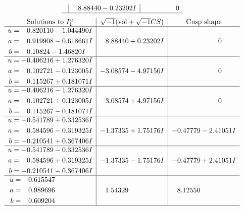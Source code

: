 \documentclass[1p]{elsarticle_modified}
\theoremstyle{definition}
\newcommand{\I}{\sqrt{-1}}
\begin{document}
$$\begin{array}{c|c|c}
 & \phantom{-}8.88440 - 0.23202 I & \phantom{-0.000000 } 0\\
 \hline 
 \end{array}$$\newpage$$\begin{array}{c|c|c}  
\text{Solutions to }I^u_{1}& \I (\text{vol} + \sqrt{-1}CS) & \text{Cusp shape}\\
 \hline 
\begin{aligned}
u &= \phantom{-}0.820110 - 1.044490 I \\
a &= \phantom{-}0.919908 - 0.618661 I \\
b &= \phantom{-}0.10824 - 1.46820 I\end{aligned}
 & \phantom{-}8.88440 + 0.23202 I & \phantom{-0.000000 } 0 \\ \hline\begin{aligned}
u &= -0.406216 + 1.276320 I \\
a &= \phantom{-}0.102721 - 0.123005 I \\
b &= \phantom{-}0.115267 + 0.181071 I\end{aligned}
 & -3.08574 - 4.97156 I & \phantom{-0.000000 } 0 \\ \hline\begin{aligned}
u &= -0.406216 - 1.276320 I \\
a &= \phantom{-}0.102721 + 0.123005 I \\
b &= \phantom{-}0.115267 - 0.181071 I\end{aligned}
 & -3.08574 + 4.97156 I & \phantom{-0.000000 } 0 \\ \hline\begin{aligned}
u &= -0.541789 + 0.332536 I \\
a &= \phantom{-}0.584596 - 0.319325 I \\
b &= -0.210541 + 0.367406 I\end{aligned}
 & -1.37335 + 1.75176 I & -0.47779 - 2.41051 I \\ \hline\begin{aligned}
u &= -0.541789 - 0.332536 I \\
a &= \phantom{-}0.584596 + 0.319325 I \\
b &= -0.210541 - 0.367406 I\end{aligned}
 & -1.37335 - 1.75176 I & -0.47779 + 2.41051 I \\ \hline\begin{aligned}
u &= \phantom{-}0.615547\phantom{ +0.000000I} \\
a &= \phantom{-}0.989696\phantom{ +0.000000I} \\
b &= \phantom{-}0.609204\phantom{ +0.000000I}\end{aligned}
 & \phantom{-}1.54329\phantom{ +0.000000I} & \phantom{-}8.12550\phantom{ +0.000000I}\\
 \hline 
 \end{array}$$\newpage\newpage\renewcommand{\arraystretch}{1}
\end{document}
